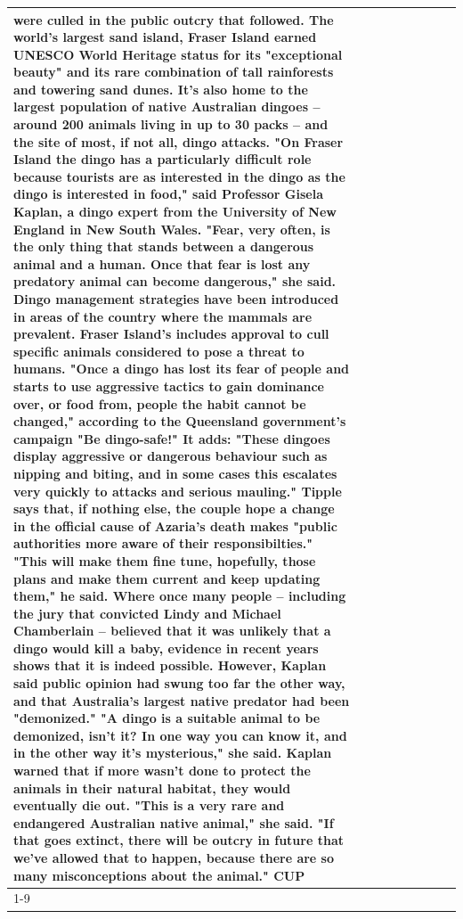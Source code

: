\begin{table}[H]
\begin{tabular}{lllrlllll}
were culled in the public outcry that followed. The world's largest sand island, Fraser Island earned UNESCO World Heritage status for its "exceptional beauty" and its rare combination of tall rainforests and towering sand dunes. It's also home to the largest population of native Australian dingoes -- around 200 animals living in up to 30 packs -- and the site of most, if not all, dingo attacks. "On Fraser Island the dingo has a particularly difficult role because tourists are as interested in the dingo as the dingo is interested in food," said Professor Gisela Kaplan, a dingo expert from the University of New England in New South Wales. "Fear, very often, is the only thing that stands between a dangerous animal and a human. Once that fear is lost any predatory animal can become dangerous," she said. Dingo management strategies have been introduced in areas of the country where the mammals are prevalent. Fraser Island's includes approval to cull specific animals considered to pose a threat to humans. "Once a dingo has lost its fear of people and starts to use aggressive tactics to gain dominance over, or food from, people the habit cannot be changed," according to the Queensland government's campaign "Be dingo-safe!" It adds: "These dingoes display aggressive or dangerous behaviour such as nipping and biting, and in some cases this escalates very quickly to attacks and serious mauling." Tipple says that, if nothing else, the couple hope a change in the official cause of Azaria's death makes "public authorities more aware of their responsibilties." "This will make them fine tune, hopefully, those plans and make them current and keep updating them," he said. Where once many people -- including the jury that convicted Lindy and Michael Chamberlain -- believed that it was unlikely that a dingo would kill a baby, evidence in recent years shows that it is indeed possible. However, Kaplan said public opinion had swung too far the other way, and that Australia's largest native predator had been "demonized." "A dingo is a suitable animal to be demonized, isn't it? In one way you can know it, and in the other way it's mysterious," she said. Kaplan warned that if more wasn't done to protect the animals in their natural habitat, they would eventually die out. "This is a very rare and endangered Australian native animal," she said. "If that goes extinct, there will be outcry in future that we've allowed that to happen, because there are so many misconceptions about the animal." CUP \\
\cline{1-9}

\end{tabular}
\end{table}

